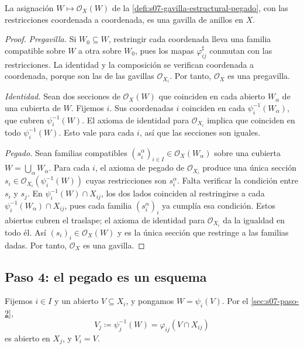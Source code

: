 \begin{prop}
\label{prop:s07-gavilla-estructural}
La asignación $W\mapsto\mathcal O_X(W)$ de la \cref{defi:s07-gavilla-estructural-pegado}, con las restricciones coordenada a coordenada, es una gavilla de anillos en $X$.
\end{prop}
\begin{proof}
\emph{Pregavilla.} Si $W_0\subseteq W$, restringir cada coordenada lleva una familia compatible sobre $W$ a otra sobre $W_0$, pues los mapas $\varphi_{ij}^{\sharp}$ conmutan con las restricciones. La identidad y la composición se verifican coordenada a coordenada, porque son las de las gavillas $\mathcal O_{X_i}$. Por tanto, $\mathcal O_X$ es una pregavilla.

\emph{Identidad.} Sean dos secciones de $\mathcal O_X(W)$ que coinciden en cada abierto $W_\alpha$ de una cubierta de $W$. Fijemos $i$. Sus coordenadas $i$ coinciden en cada $\psi_i^{-1}(W_\alpha)$, que cubren $\psi_i^{-1}(W)$. El axioma de identidad para $\mathcal O_{X_i}$ implica que coinciden en todo $\psi_i^{-1}(W)$. Esto vale para cada $i$, así que las secciones son iguales.

\emph{Pegado.} Sean familias compatibles $(s_i^\alpha)_{i\in I}\in\mathcal O_X(W_\alpha)$ sobre una cubierta $W=\bigcup_\alpha W_\alpha$. Para cada $i$, el axioma de pegado de $\mathcal O_{X_i}$ produce una única sección $s_i\in\mathcal O_{X_i}(\psi_i^{-1}(W))$ cuyas restricciones son $s_i^\alpha$. Falta verificar la condición entre $s_i$ y $s_j$. En $\psi_i^{-1}(W)\cap X_{ij}$, los dos lados coinciden al restringirse a cada $\psi_i^{-1}(W_\alpha)\cap X_{ij}$, pues cada familia $(s_i^\alpha)_i$ ya cumplía esa condición. Estos abiertos cubren el traslape; el axioma de identidad para $\mathcal O_{X_i}$ da la igualdad en todo él. Así $(s_i)_i\in\mathcal O_X(W)$ y es la única sección que restringe a las familias dadas. Por tanto, $\mathcal O_X$ es una gavilla.
\end{proof}

\subsection{Paso 4: el pegado es un esquema}
\label{sec:s07-paso-4}

Fijemos $i\in I$ y un abierto $V\subseteq X_i$, y pongamos $W=\psi_i(V)$. Por el \cref{sec:s07-paso-2},
\[
V_j\coloneqq \psi_j^{-1}(W)=\varphi_{ij}(V\cap X_{ij})
\]
es abierto en $X_j$, y $V_i=V$.

